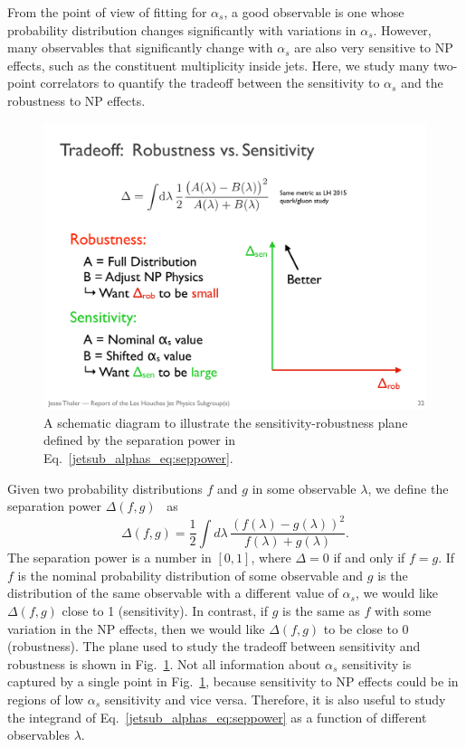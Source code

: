 \documentclass[11pt]{cernrep}
\begin{document}
From the point of view of fitting for $\alpha_s$, a good observable is one whose probability distribution changes significantly with variations in $\alpha_s$.
%
However, many observables that significantly change with $\alpha_s$ are also very sensitive to NP effects, such as the constituent multiplicity inside jets.
%
Here, we study many two-point correlators to quantify the tradeoff between the sensitivity to $\alpha_s$ and the robustness to NP effects.

\begin{figure}[t]
\begin{center}
\includegraphics[width = 0.4\columnwidth]{jetsub_alphas_robustnessschematic.pdf}
\end{center}
\caption{A schematic diagram to illustrate the sensitivity-robustness plane defined by the separation power in Eq.~\eqref{jetsub_alphas_eq:seppower}.}
\label{jetsub_alphas_fig:robustnessschematic}
\end{figure}

Given two probability distributions $f$ and $g$ in some observable $\lambda$, we define the separation power $\Delta(f,g)$~\cite{Harrison:1998yr} as
%
\begin{equation}
\label{jetsub_alphas_eq:seppower}
\Delta(f,g)=\frac{1}{2}\int d\lambda \, \frac{(f(\lambda)-g(\lambda))^2}{f(\lambda)+g(\lambda)}.
\end{equation}
%
The separation power is a number in $[0,1]$, where $\Delta=0$ if and only if $f=g$.
%
If $f$ is the nominal probability distribution of some observable and $g$ is the distribution of the same observable with a different value of $\alpha_s$, we would like $\Delta(f,g)$ close to 1 (sensitivity).
%
In contrast, if $g$ is the same as $f$ with some variation in the NP effects, then we would like $\Delta(f,g)$ to be close to $0$ (robustness).
%
The plane used to study the tradeoff between sensitivity and robustness is shown in Fig.~\ref{jetsub_alphas_fig:robustnessschematic}.
%
Not all information about $\alpha_s$ sensitivity is captured by a single point in Fig.~\ref{jetsub_alphas_fig:robustnessschematic}, because sensitivity to NP effects could be in regions of low $\alpha_s$ sensitivity and vice versa.
%
Therefore, it is also useful to study the integrand of Eq.~\eqref{jetsub_alphas_eq:seppower} as a function of different observables $\lambda$.
\end{document}
